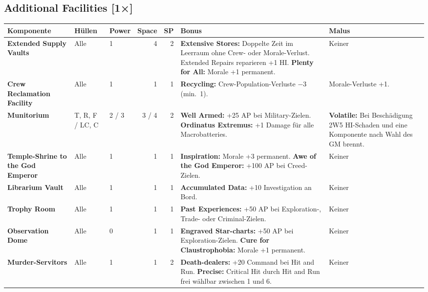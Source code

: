 \documentclass[9pt,a4paper]{extarticle}
\newcommand{\plus}[1]{\textcolor{good}{#1}}
\newcommand{\minus}[1]{\textcolor{bad}{#1}}
\newcommand{\nm}[1]{\textbf{#1}}
\newcommand{\eff}[1]{\textbf{#1:}}
\newcommand{\once}{{\monofont\scriptsize\color{ink3}[1×]}}
\begin{document}
\subsection{Additional Facilities \once}
\begin{xltabular}{\linewidth}{l H P N N Y Y}
\toprule
{}\textbf{Komponente} & \textbf{Hüllen} & \textbf{Power} & \textbf{Space} & \textbf{SP} & \textbf{Bonus} & \textbf{Malus}\\
\midrule
\endhead
\nm{Extended Supply Vaults} & Alle & 1 & 4 & 2 & \eff{Extensive Stores} Doppelte Zeit im Leerraum ohne Crew- oder Morale-Verlust. Extended Repairs reparieren \plus{+1 HI}. \eff{Plenty for All} \plus{Morale +1} permanent. & Keiner\\
\nm{Crew Reclamation Facility} & Alle & 1 & 1 & 1 & \eff{Recycling} \plus{Crew-Population-Verluste −3} (min.\ 1). & \minus{Morale-Verluste +1}.\\
\nm{Munitorium} & T, R, F / LC, C & 2 / 3 & 3 / 4 & 2 & \eff{Well Armed} \plus{+25 AP} bei Military-Zielen. \eff{Ordinatus Extremus} \plus{+1 Damage} für alle Macrobatteries. & \eff{Volatile} Bei Beschädigung \minus{2W5 HI-Schaden} und eine Komponente nach Wahl des GM brennt.\\
\nm{Temple-Shrine to the God Emperor} & Alle & 1 & 1 & 1 & \eff{Inspiration} \plus{Morale +3} permanent. \eff{Awe of the God Emperor} \plus{+100 AP} bei Creed-Zielen. & Keiner\\
\nm{Librarium Vault} & Alle & 1 & 1 & 1 & \eff{Accumulated Data} \plus{+10 Investigation} an Bord. & Keiner\\
\nm{Trophy Room} & Alle & 1 & 1 & 1 & \eff{Past Experiences} \plus{+50 AP} bei Exploration-, Trade- oder Criminal-Zielen. & Keiner\\
\nm{Observation Dome} & Alle & 0 & 1 & 1 & \eff{Engraved Star-charts} \plus{+50 AP} bei Exploration-Zielen. \eff{Cure for Claustrophobia} \plus{Morale +1} permanent. & Keiner\\
\nm{Murder-Servitors} & Alle & 1 & 1 & 2 & \eff{Death-dealers} \plus{+20 Command} bei Hit and Run. \eff{Precise} Critical Hit durch Hit and Run frei wählbar zwischen 1 und 6. & Keiner\\
\bottomrule
\end{xltabular}
\end{document}
